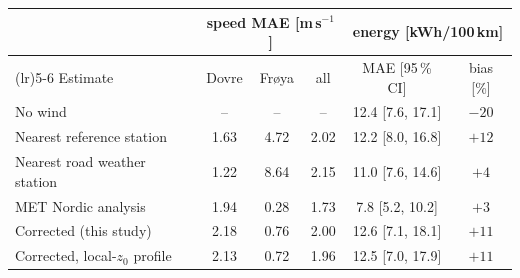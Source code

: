 \begin{tabular}{>{\raggedright\arraybackslash}p{}ccccc}
\toprule
 & \multicolumn{3}{c}{speed MAE [m\,s$^{-1}$]} & \multicolumn{2}{c}{energy [kWh/100\,km]} \\
\cmidrule(lr){2-4}\cmidrule(lr){5-6}
Estimate & Dovre & Frøya & all & MAE [95\,\% CI] & bias [\%] \\
\midrule
No wind & -- & -- & -- & 12.4 [7.6, 17.1] & $-20$ \\
Nearest reference station & 1.63 & 4.72 & 2.02 & 12.2 [8.0, 16.8] & $+12$ \\
Nearest road weather station & 1.22 & 8.64 & 2.15 & 11.0 [7.6, 14.6] & $+4$ \\
MET Nordic analysis & 1.94 & 0.28 & 1.73 & 7.8 [5.2, 10.2] & $+3$ \\
Corrected (this study) & 2.18 & 0.76 & 2.00 & 12.6 [7.1, 18.1] & $+11$ \\
Corrected, local-$z_0$ profile & 2.13 & 0.72 & 1.96 & 12.5 [7.0, 17.9] & $+11$ \\
\bottomrule
\end{tabular}
